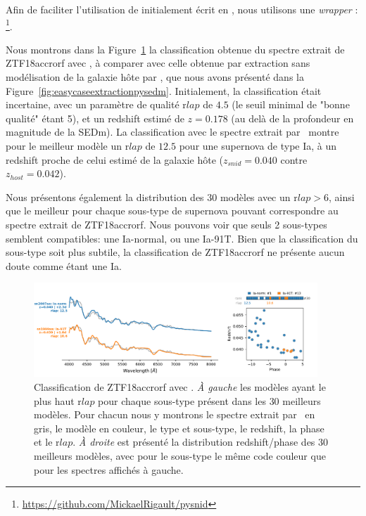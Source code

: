\documentclass[../main/main.tex]{subfiles}
\begin{document}
Afin de faciliter l'utilisation de  initialement écrit en
, nous utilisons une \textit{wrapper} :
\footnote{\url{https://github.com/MickaelRigault/pysnid}}.

Nous montrons dans la Figure~\ref{fig:snidZTF18accrorf} la
classification obtenue du spectre extrait de ZTF18accrorf avec \hypergal, à comparer
avec celle obtenue par extraction sans modélisation de la galaxie hôte
par \pysedm, que nous avons présenté dans la
Figure~\ref{fig:easycaseextractionpysedm}. Initialement, la
classification était incertaine, avec un paramètre de qualité
r$lap$ de $4.5$ (le seuil minimal de "bonne qualité" étant 5), et un
redshift estimé de $z=0.178$ (au delà de la profondeur en magnitude de
la SEDm).
La classification avec le spectre extrait par \hypergal\ montre pour le
meilleur modèle un r$lap$ de $12.5$ pour une supernova de type Ia, à un
redshift proche de celui estimé de la galaxie hôte ($z_{snid}=0.040$
contre $z_{host}=0.042$).

Nous présentons également la distribution des $30$ modèles avec un
r$lap>6$, ainsi que le meilleur pour chaque sous-type de supernova
pouvant correspondre au spectre extrait de ZTF18accrorf. Nous pouvons
voir que seuls 2 sous-types semblent compatibles: une Ia-normal, ou une
Ia-91T. Bien que la classification du sous-type soit plus subtile, la
classification de ZTF18accrorf ne présente aucun doute comme étant une
Ia.

\begin{figure}[ht]
  \centering
  \includegraphics[width=0.95\textwidth]{../figures/07_scene/ZTF18accrorf_snid_typing.pdf}
  \caption[Classification de ZTF18accrorf avec
  ]{Classification de ZTF18accrorf avec . \emph{À
      gauche} les modèles ayant le plus haut r$lap$ pour chaque
    sous-type présent dans les $30$ meilleurs modèles. Pour chacun nous
    y montrons le spectre extrait par \hypergal\ en gris, le modèle en couleur, le type et sous-type, le redshift, la phase et
  le r$lap$. \emph{À droite} est présenté la distribution
  redshift/phase des $30$ meilleurs modèles, avec pour le
  sous-type le même code couleur que pour les spectres affichés à gauche.}
  \label{fig:snidZTF18accrorf}
\end{figure}
\end{document}
